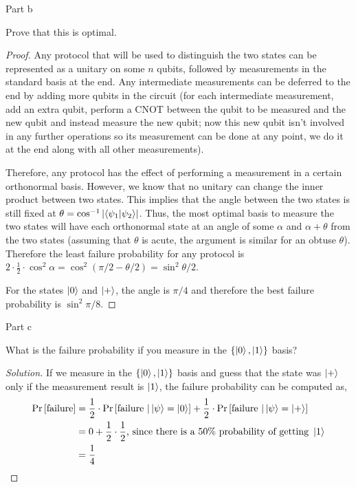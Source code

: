 \begin{solution}{Part b}\label{ques:4b}
  \begin{question}
    Prove that this is optimal.
  \end{question}
  \tcblower{}
  \begin{proof}
    Any protocol that will be used to distinguish the two states can be represented as a unitary on some $n$ qubits, followed by measurements in the standard basis at the end. Any intermediate measurements can be deferred to the end by adding more qubits in the circuit (for each intermediate measurement, add an extra qubit, perform a CNOT between the qubit to be measured and the new qubit and instead measure the new qubit; now this new qubit isn't involved in any further operations so its measurement can be done at any point, we do it at the end along with all other measurements).\par
    Therefore, any protocol has the effect of performing a measurement in a certain orthonormal basis. However, we know that no unitary can change the inner product between two states. This implies that the angle between the two states is still fixed at $\theta = \cos^{-1}\left|\braket{\psi_1|\psi_2}\right|$. Thus, the most optimal basis to measure the two states will have each orthonormal state at an angle of some $\alpha$ and $\alpha + \theta$ from the two states (assuming that $\theta$ is acute, the argument is similar for an obtuse $\theta$). Therefore the least failure probability for any protocol is $2\cdot \frac{1}{2}\cdot \cos^2\alpha = \cos^2(\pi/2 - \theta/2) = \sin^2\theta/2$.\par
    For the states $\ket{0}$ and $\ket{+}$, the angle is $\pi/4$ and therefore the best failure probability is $\sin^2\pi/8$.
  \end{proof}
\end{solution}

\begin{solution}{Part c}\label{ques:4c}
  \begin{question}
    What is the failure probability if you measure in the $\{\ket{0}, \ket{1}\}$ basis?
  \end{question}
  \tcblower{}
  \begin{proof}[Solution]
    If we measure in the $\{\ket{0}, \ket{1}\}$ basis and guess that the state was $\ket{+}$ only if the measurement result is $\ket{1}$, the failure probability can be computed as,
    \begin{equation}
      \begin{split}
        \Pr\left[ \text{failure} \right] &= \frac{1}{2}\cdot\Pr\left[ \text{failure }| \ket{\psi} = \ket{0} \right] + \frac{1}{2}\cdot\Pr\left[ \text{failure }| \ket{\psi} = \ket{+} \right]\\
        &= 0 + \frac{1}{2}\cdot\frac{1}{2}\text{, since there is a 50\% probability of getting }\ket{1}\\
        &= \frac{1}{4}
      \end{split}
    \end{equation}
  \end{proof}
\end{solution}

